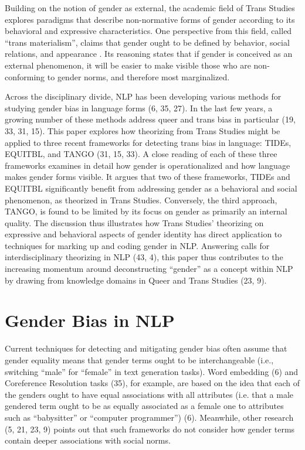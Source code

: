 \documentclass[11pt]{article}
\begin{document}
Building on the notion of gender as external, the academic field of Trans Studies explores paradigms that describe non-normative forms of gender according to its behavioral and expressive characteristics. One perspective from this field, called “trans materialism”, claims that gender ought to be defined by behavior, social relations, and appearance \citep{amin:2022}. Its reasoning states that if gender is conceived as an external phenomenon, it will be easier to make visible those who are non-conforming to gender norms, and therefore most marginalized.

Across the disciplinary divide, NLP has been developing various methods for studying gender bias in language forms (6, 35, 27). In the last few years, a growing number of these methods address queer and trans bias in particular (19, 33, 31, 15). This paper explores how theorizing from Trans Studies might be applied to three recent frameworks for detecting trans bias in language: TIDEs, EQUITBL, and TANGO (31, 15, 33). A close reading of each of these three frameworks examines in detail how gender is operationalized and how language makes gender forms visible. It argues that two of these frameworks, TIDEs and EQUITBL significantly benefit from addressing gender as a behavioral and social phenomenon, as theorized in Trans Studies. Conversely, the third approach, TANGO, is found to be limited by its focus on gender as primarily an internal quality. The discussion thus illustrates how Trans Studies’ theorizing on expressive and behavioral aspects of gender identity has direct application to techniques for marking up and coding gender in NLP. Answering calls for interdisciplinary theorizing in NLP (43, 4), this paper thus contributes to the increasing momentum around deconstructing “gender” as a concept within NLP by drawing from knowledge domains in Queer and Trans Studies (23, 9).

\section{Gender Bias in NLP}
Current techniques for detecting and mitigating gender bias often assume that gender equality means that gender terms ought to be interchangeable (i.e., switching “male” for “female” in text generation tasks). Word embedding (6) and Coreference Resolution tasks (35), for example, are based on the idea that each of the genders ought to have equal associations with all attributes (i.e. that a male gendered term ought to be as equally associated as a female one to attributes such as “babysitter” or “computer programmer”) (6). Meanwhile, other research (5, 21, 23, 9) points out that such frameworks do not consider how gender terms contain deeper associations with social norms. 
\end{document}
